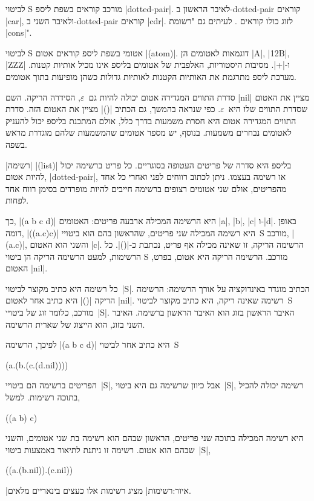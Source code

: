 לביטוי S מורכב קוראים בשפת ליספ \E|dotted-pair|. לאיבר הראשון ב-dotted-pair
קוראים \E|car|, ולאיבר השני ב-dotted-pair קוראים \E|cdr|. לזוג כולו קוראים
.
לעיתים גם "רשומת \E|cons|".

לביטוי S אטומי בשפת ליספ קוראים אטום \E|(atom)|. דוגמאות לאטומים הן \E|A|,
\E|12B|, \E|ZZZ| ו-\E|+|. מסיבות היסטוריות, האלפבית של אטומים בליספ אינו מכיל
אותיות קטנות. מערכת ליספ מתרגמת את האותיות הקטנות לאותיות גדולות כשהן מופיעות
בתוך אטומים.

סדרת התווים המגדירה אטום יכולה להיות גם~$ε$, הסידרה הריקה. השם \E|nil| מציין את
האטום שסדרת התווים שלו היא~$ε$. כפי שנראה בהמשך, גם הכתיב \E|()| מציין את האטום
הזה. סדרת התווים המגדירה אטום היא חסרת משמעות בדרך כלל, אולם המתכנת בליספ יכול
להעניק לאטומים נבחרים משמעות. בנוסף, יש מספר אטומים שהמשמעות שלהם מוגדרת מראש
בשפה.

\ע|רשימה| \E|(list)| בליספ היא סדרה של פריטים העטופה בסוגריים. כל פריט ברשימה
יכול להיות אטום, \E|dotted-pair|, או רשימה בעצמו. ניתן לכתוב רווחים לפני ואחרי
כל אחד מהפריטים, אולם שני אטומים רצופים ברשימה חייבים להיות מופרדים בסימן רווח
אחד לפחות.

כך, \E|(a b c d)| היא הרשימה המכילה ארבעה פריטים: האטומים \E|a|, \E|b|, \E|c|
ו-\E|d|. באופן דומה, \E|((a.c)c)| היא רשימה המכילה שני פריטים, שהראשון בהם הוא ביטויי~S מורכב,
\E|(a.c)|, והשני הוא האטום \E|c|.
הרשימה הריקה, זו שאינה מכילה אף פריט, נכתבת כ-\E|()|. כל הרשימות, למעט הרשימה
הריקה הן ביטוי S מורכב. הרשימה הריקה היא אטום, בפרט, האטום \E|nil|.

כל רשימה היא כתיב מקוצר לביטוי~\E|S|. הכתיב מוגדר באינדוקציה על אורך הרשימה:
הרשימה הריקה \E|()| היא כתיב אחר לאטום \E|nil|. רשימה שאינה ריקה, היא כתיב
מקוצר לביטוי~S מורכב, כלומר זוג של ביטויי~\E|S|. האיבר הראשון בזוג הוא האיבר
הראשון ברשימה. האיבר השני בזוג, הוא הייצוג של שארית הרשימה.

לפיכך, הרשימה \E|(a b c d)| היא כתיב אחר לביטוי~S
\begin{LISP}
(a.(b.(c.(d.nil))))
\end{LISP}

הפריטים ברשימה הם ביטויי~\E|S|, אבל כיוון שרשימה גם היא ביטוי~\E|S|, רשימה
יכולה להכיל בתוכה רשימות. למשל,
\begin{LISP}
  ((a b) c)
\end{LISP}
היא רשימה המכילה בתוכה שני פריטים, הראשון שבהם הוא רשימה בת שני אטומים, והשני
שבהם הוא אטום. רשימה זו ניתנת לתיאור באמצעות ביטוי~\E|S|,
\begin{LISP}
  ((a.(b.nil)).(c.nil))
\end{LISP}
|איור:רשימות| מציג רשימות אלו כעצים בינאריים מלאים.

